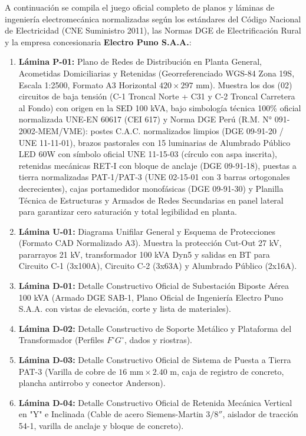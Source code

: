 \documentclass[12pt,a4paper]{report}
\begin{document}
A continuación se compila el juego oficial completo de planos y láminas de ingeniería electromecánica normalizadas según los estándares del Código Nacional de Electricidad (CNE Suministro 2011), las Normas DGE de Electrificación Rural y la empresa concesionaria \textbf{Electro Puno S.A.A.}:
\begin{enumerate}
    \item \textbf{Lámina P-01:} Plano de Redes de Distribución en Planta General, Acometidas Domiciliarias y Retenidas (Georreferenciado WGS-84 Zona 19S, Escala 1:2500, Formato A3 Horizontal $420 \times 297\text{ mm}$). Muestra los dos (02) circuitos de baja tensión (C-1 Troncal Norte + C31 y C-2 Troncal Carretera al Fondo) con origen en la SED 100 kVA, bajo simbología técnica 100\% oficial normalizada UNE-EN 60617 (CEI 617) y Norma DGE Perú (R.M. N° 091-2002-MEM/VME): postes C.A.C. normalizados limpios (DGE 09-91-20 / UNE 11-11-01), brazos pastorales con 15 luminarias de Alumbrado Público LED 60W con símbolo oficial UNE 11-15-03 (círculo con aspa inscrita), retenidas mecánicas RET-I con bloque de anclaje (DGE 09-91-18), puestas a tierra normalizadas PAT-1/PAT-3 (UNE 02-15-01 con 3 barras ortogonales decrecientes), cajas portamedidor monofásicas (DGE 09-91-30) y Planilla Técnica de Estructuras y Armados de Redes Secundarias en panel lateral para garantizar cero saturación y total legibilidad en planta.
    \item \textbf{Lámina U-01:} Diagrama Unifilar General y Esquema de Protecciones (Formato CAD Normalizado A3). Muestra la protección Cut-Out 27 kV, pararrayos 21 kV, transformador 100 kVA Dyn5 y salidas en BT para Circuito C-1 (3x100A), Circuito C-2 (3x63A) y Alumbrado Público (2x16A).
    \item \textbf{Lámina D-01:} Detalle Constructivo Oficial de Subestación Biposte Aérea 100 kVA (Armado DGE SAB-1, Plano Oficial de Ingeniería Electro Puno S.A.A. con vistas de elevación, corte y lista de materiales).
    \item \textbf{Lámina D-02:} Detalle Constructivo de Soporte Metálico y Plataforma del Transformador (Perfiles $F^\circ G^\circ$, dados y riostras).
    \item \textbf{Lámina D-03:} Detalle Constructivo Oficial de Sistema de Puesta a Tierra PAT-3 (Varilla de cobre de $16\text{ mm} \times 2.40\text{ m}$, caja de registro de concreto, plancha antirrobo y conector Anderson).
    \item \textbf{Lámina D-04:} Detalle Constructivo Oficial de Retenida Mecánica Vertical en "Y" e Inclinada (Cable de acero Siemens-Martin $3/8''$, aislador de tracción 54-1, varilla de anclaje y bloque de concreto).

\end{enumerate}
\end{document}
